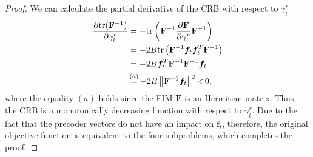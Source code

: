 \documentclass[twocolumn,journal]{IEEEtran}
\begin{document}
\begin{proof}
    We can calculate the partial derivative of the CRB with respect to \(\gamma_{t}^{r}\)
    \begin{align}
        \frac{\partial \text{tr}(\mathbf{F}^{-1})}{\partial \gamma_{t}^{r}} &= -\text{tr}\left(\mathbf{F}^{-1} \frac{\partial \mathbf{F}}{\partial \gamma_{t}^{r}} \mathbf{F}^{-1} \right)\notag\\
        &= -2B\text{tr}\left(\mathbf{F}^{-1} \boldsymbol{f}_{t}\boldsymbol{f}^{T}_{t} \mathbf{F}^{-1} \right) \notag\\
        &= -2B\boldsymbol{f}^{T}_{t} \mathbf{F}^{-1}\mathbf{F}^{-1} \boldsymbol{f}_{t} \notag\\
        &\mathop{=}^{(a)}-2B\left\Vert \mathbf{F}^{-1} \boldsymbol{f}_{t} \right\Vert^2 \mathop{<} 0,
    \end{align}
    where the equality \((a)\) holds since the FIM \(\mathbf{F}\) is an Hermitian matrix. Thus, the CRB is a monotonically decreasing function with respect to \(\gamma_{t}^{r}\). Due to the fact that the precoder vectors do not have an impact on \(\boldsymbol{f}_t\), therefore, the original objective function is equivalent to the four subproblems, which completes the proof.
\end{proof}
\end{document}
